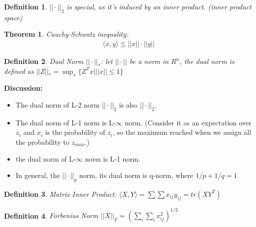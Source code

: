 \documentclass[12pt]{article}
\newtheorem{theorem}{Theorem}[section]
\newtheorem{definition}{Definition}[section]
\begin{document}
\begin{definition}
	$||\cdot||_2$ is special, as it's induced by an inner product. (inner product space)
\end{definition}
\begin{theorem}
	Cauchy-Schwatz inequality: 
	\begin{eqnarray}
		\langle x,y\rangle \le ||x||\cdot ||y||
	\end{eqnarray}
\end{theorem}
\begin{definition}
	Dual Norm $||\cdot||_*$: let $||\cdot||$ be a norm in $R^n$, the dual norm is defined as $||Z||_*=\sup_x\{Z^Tx| ||x||\le 1\}$
\end{definition}
{\bf Discussion:} 
\begin{itemize}
	\item The dual norm of L-2 norm $||\cdot||_2$ is also $||\cdot||_2$. 
	\item The dual norm of L-1 norm is L-$\infty$ norm. (Consider it as an expectation over $z_i$ and $x_i$ is the probability of $z_i$, so the maximum reached when we assign all the probability to $z_{max}$.)
	\item the dual norm of L-$\infty$ norm is L-1 norm.
	\item In general, the $||\cdot||_p$ norm, its dual norm is q-norm, where $1/p + 1/q = 1$
\end{itemize}

\begin{definition}
	Matrix Inner Product: $\langle X,Y\rangle = \sum\sum x_{ij}y_{ij}=tr(XY^T)$
\end{definition}
\begin{definition}
	Forbenius Norm $||X||_F = (\sum_i\sum_i x_{ij}^2)^{1/2}$
\end{definition}
\end{document}
